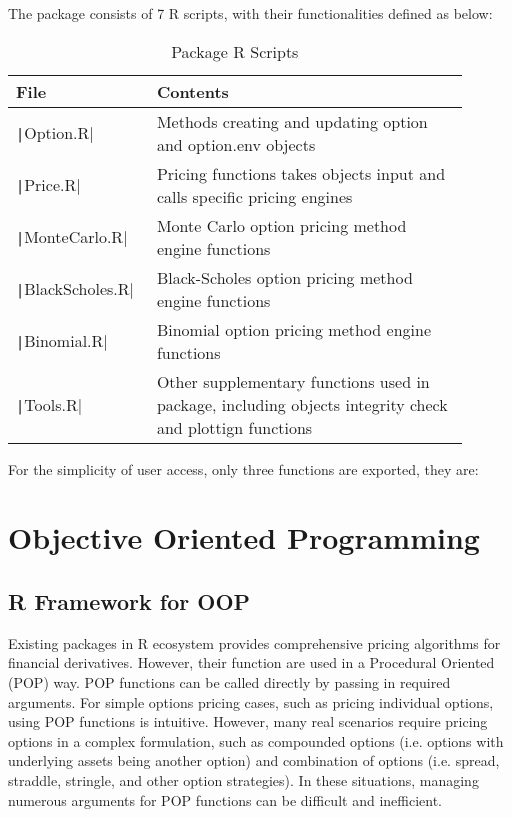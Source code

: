 The package consists of 7 R scripts, with their functionalities defined as below:

\begin{table}[H]
\begin{tabular}{p{0.25\linewidth} | p{0.65\linewidth}}
File                           & Contents \\ \hline
\texttt|Option.R|       & Methods creating and updating option and option.env objects \\
\texttt|Price.R|        & Pricing functions takes objects input and calls specific pricing engines \\
\texttt|MonteCarlo.R|   & Monte Carlo option pricing method engine functions \\
\texttt|BlackScholes.R| & Black-Scholes option pricing method engine functions \\
\texttt|Binomial.R|     & Binomial option pricing method engine functions \\
\texttt|Tools.R|        & Other supplementary functions used in package, including objects integrity check and plottign functions
\end{tabular}
\caption{Package R Scripts} \label{tab:pkg_scripts}
\end{table} 

For the simplicity of user access, only three functions are exported, they are:

\section{Objective Oriented Programming}

\subsection{R Framework for OOP}

Existing packages in R ecosystem provides comprehensive pricing algorithms for financial derivatives. However, their function are used in a Procedural Oriented (POP) way. POP functions can be called directly by passing in required arguments. For simple options pricing cases, such as pricing individual options, using POP functions is intuitive. However, many real scenarios require pricing options in a complex formulation, such as compounded options (i.e. options with underlying assets being another option) and combination of options (i.e. spread, straddle, stringle, and other option strategies). In these situations, managing numerous arguments for POP functions can be difficult and inefficient.

